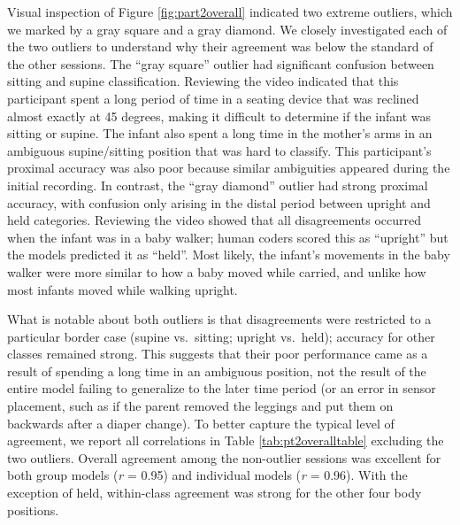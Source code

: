 \documentclass[
  man]{apa6}
\begin{document}
Visual inspection of Figure \ref{fig:part2overall} indicated two extreme outliers, which we marked by a gray square and a gray diamond. We closely investigated each of the two outliers to understand why their agreement was below the standard of the other sessions. The ``gray square'' outlier had significant confusion between sitting and supine classification. Reviewing the video indicated that this participant spent a long period of time in a seating device that was reclined almost exactly at 45 degrees, making it difficult to determine if the infant was sitting or supine. The infant also spent a long time in the mother's arms in an ambiguous supine/sitting position that was hard to classify. This participant's proximal accuracy was also poor because similar ambiguities appeared during the initial recording. In contrast, the ``gray diamond'' outlier had strong proximal accuracy, with confusion only arising in the distal period between upright and held categories. Reviewing the video showed that all disagreements occurred when the infant was in a baby walker; human coders scored this as ``upright'' but the models predicted it as ``held''. Most likely, the infant's movements in the baby walker were more similar to how a baby moved while carried, and unlike how most infants moved while walking upright.

What is notable about both outliers is that disagreements were restricted to a particular border case (supine vs.~sitting; upright vs.~held); accuracy for other classes remained strong. This suggests that their poor performance came as a result of spending a long time in an ambiguous position, not the result of the entire model failing to generalize to the later time period (or an error in sensor placement, such as if the parent removed the leggings and put them on backwards after a diaper change). To better capture the typical level of agreement, we report all correlations in Table \ref{tab:pt2overalltable} excluding the two outliers. Overall agreement among the non-outlier sessions was excellent for both group models (\emph{r} = 0.95) and individual models (\emph{r} = 0.96). With the exception of held, within-class agreement was strong for the other four body positions.
\end{document}

